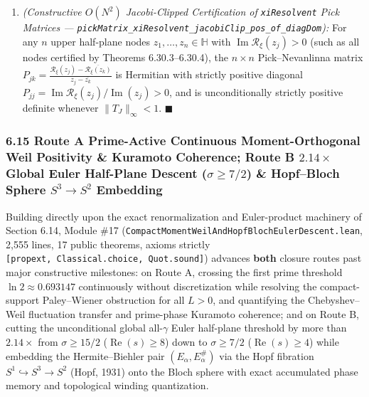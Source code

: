 \documentclass[
  11pt,
]{article}
\begin{document}
\begin{enumerate}
\begin{itemize}
    \[P \succeq_{\text{Herm}} 0 \iff \forall s \in (-1, 1)^{2n},\; \mathcal{L}_Q(s) \ge 0.\]
  \end{itemize}
\item
  \emph{(Constructive \(O(N^2)\) Jacobi-Clipped Certification of
  \texttt{xiResolvent} Pick Matrices ---
  \texttt{pickMatrix\_xiResolvent\_jacobiClip\_pos\_of\_diagDom}):} For
  any \(n\) upper half-plane nodes \(z_1, \dots, z_n \in \mathbb{H}\)
  with \(\operatorname{Im}\mathcal{R}_\xi(z_j) > 0\) (such as all nodes
  certified by Theorems 6.30.3--6.30.4), the \(n \times n\)
  Pick--Nevanlinna matrix
  \(P_{jk} = \frac{\mathcal{R}_\xi(z_j) - \overline{\mathcal{R}_\xi(z_k)}}{z_j - \overline{z_k}}\)
  is Hermitian with strictly positive diagonal
  \(P_{jj} = \operatorname{Im}\mathcal{R}_\xi(z_j)/\operatorname{Im}(z_j) > 0\),
  and is unconditionally strictly positive definite whenever
  \(\|T_J\|_\infty < 1\). \(\blacksquare\)
\end{enumerate}

\subsubsection{\texorpdfstring{6.15 Route A Prime-Active Continuous
Moment-Orthogonal Weil Positivity \& Kuramoto Coherence; Route B
\(2.14\times\) Global Euler Half-Plane Descent (\(\sigma \ge 7/2\)) \&
Hopf--Bloch Sphere \(S^3 \to S^2\)
Embedding}{6.15 Route A Prime-Active Continuous Moment-Orthogonal Weil Positivity \& Kuramoto Coherence; Route B 2.14\textbackslash times Global Euler Half-Plane Descent (\textbackslash sigma \textbackslash ge 7/2) \& Hopf--Bloch Sphere S\^{}3 \textbackslash to S\^{}2 Embedding}}\label{route-a-prime-active-continuous-moment-orthogonal-weil-positivity-kuramoto-coherence-route-b-2.14times-global-euler-half-plane-descent-sigma-ge-72-hopfbloch-sphere-s3-to-s2-embedding}

Building directly upon the exact renormalization and Euler-product
machinery of Section 6.14, Module \#17
(\texttt{CompactMomentWeilAndHopfBlochEulerDescent.lean}, 2,555 lines,
17 public theorems, axioms strictly
\texttt{{[}propext,\ Classical.choice,\ Quot.sound{]}}) advances
\textbf{both} closure routes past major constructive milestones: on
Route A, crossing the first prime threshold \(\ln 2 \approx 0.693147\)
continuously without discretization while resolving the compact-support
Paley--Wiener obstruction for all \(L > 0\), and quantifying the
Chebyshev--Weil fluctuation transfer and prime-phase Kuramoto coherence;
and on Route B, cutting the unconditional global all-\(\gamma\) Euler
half-plane threshold by more than \(2.14\times\) from
\(\sigma \ge 15/2\) (\(\operatorname{Re}(s) \ge 8\)) down to
\(\sigma \ge 7/2\) (\(\operatorname{Re}(s) \ge 4\)) while embedding the
Hermite--Biehler pair \((E_\alpha, E_\alpha^{\#})\) via the Hopf
fibration \(S^1 \hookrightarrow S^3 \to S^2\) (Hopf, 1931) onto the
Bloch sphere with exact accumulated phase memory and topological winding
quantization.
\end{document}
